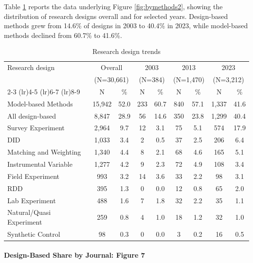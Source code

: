 \documentclass[12pt]{article}
\begin{document}
Table \ref{tab:design_trends} reports the data underlying Figure \ref{fig:bymethods2}, showing the distribution of research designs overall and for selected years. Design-based methods grew from 14.6\% of designs in 2003 to 40.4\% in 2023, while model-based methods declined from 60.7\% to 41.6\%.

\begin{table}[htbp]
\centering
\caption{Research design trends}
\label{tab:design_trends}
\begin{footnotesize}
\begin{tabular}{@{}lcccccccc@{}}
\toprule
Research design & \multicolumn{2}{c}{Overall} & \multicolumn{2}{c}{2003} & \multicolumn{2}{c}{2013} & \multicolumn{2}{c}{2023} \\
 & \multicolumn{2}{c}{(N=30,661)} & \multicolumn{2}{c}{(N=384)} & \multicolumn{2}{c}{(N=1,470)} & \multicolumn{2}{c}{(N=3,212)} \\
\cmidrule(lr){2-3} \cmidrule(lr){4-5} \cmidrule(lr){6-7} \cmidrule(lr){8-9}
 & N & \% & N & \% & N & \% & N & \% \\
\midrule
Model-based Methods & 15,942 & 52.0 & 233 & 60.7 & 840 & 57.1 & 1,337 & 41.6 \\
All design-based & 8,847 & 28.9 & 56 & 14.6 & 350 & 23.8 & 1,299 & 40.4 \\
\midrule
Survey Experiment & 2,964 & 9.7 & 12 & 3.1 & 75 & 5.1 & 574 & 17.9 \\
DID & 1,033 & 3.4 & 2 & 0.5 & 37 & 2.5 & 206 & 6.4 \\
Matching and Weighting & 1,340 & 4.4 & 8 & 2.1 & 68 & 4.6 & 165 & 5.1 \\
Instrumental Variable & 1,277 & 4.2 & 9 & 2.3 & 72 & 4.9 & 108 & 3.4 \\
Field Experiment & 993 & 3.2 & 14 & 3.6 & 33 & 2.2 & 98 & 3.1 \\
RDD & 395 & 1.3 & 0 & 0.0 & 12 & 0.8 & 65 & 2.0 \\
Lab Experiment & 488 & 1.6 & 7 & 1.8 & 32 & 2.2 & 35 & 1.1 \\
Natural/Quasi Experiment & 259 & 0.8 & 4 & 1.0 & 18 & 1.2 & 32 & 1.0 \\
Synthetic Control & 98 & 0.3 & 0 & 0.0 & 3 & 0.2 & 16 & 0.5 \\
\bottomrule
\end{tabular}
\end{footnotesize}
\end{table}


\paragraph*{Design-Based Share by Journal: Figure 7}
\end{document}
